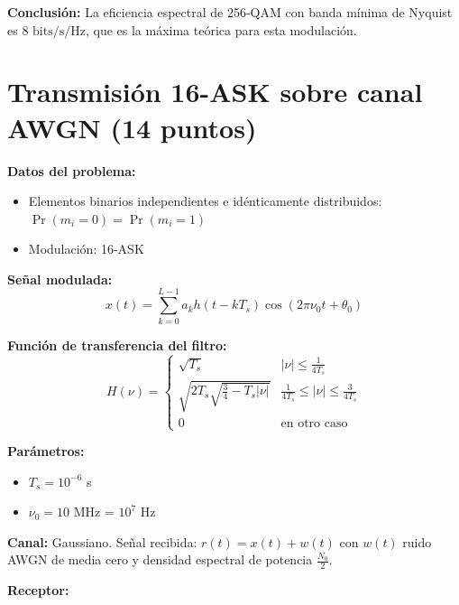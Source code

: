\documentclass[11pt,a4paper]{article}
\begin{document}
\textbf{Conclusi\'on:} La eficiencia espectral de 256-QAM con banda m\'inima de Nyquist es $\boxed{8 \text{ bits/s/Hz}}$, que es la m\'axima te\'orica para esta modulaci\'on.



\newpage
\section*{Transmisi\'on 16-ASK sobre canal AWGN (14 puntos)}

\textbf{Datos del problema:}
\begin{itemize}
    \item Elementos binarios independientes e id\'enticamente distribuidos: $\Pr(m_i = 0) = \Pr(m_i = 1)$
    \item Modulaci\'on: 16-ASK
\end{itemize}

\textbf{Se\~nal modulada:}
\[
x(t) = \sum_{k=0}^{L-1} a_k h(t-kT_s)\cos(2\pi\nu_0 t + \theta_0)
\]

\textbf{Funci\'on de transferencia del filtro:}
\[
H(\nu) = \begin{cases}
\sqrt{T_s} & |\nu| \leq \frac{1}{4T_s} \\
\sqrt{2T_s\sqrt{\frac{3}{4} - T_s|\nu|}} & \frac{1}{4T_s} \leq |\nu| \leq \frac{3}{4T_s} \\
0 & \text{en otro caso}
\end{cases}
\]

\textbf{Par\'ametros:}
\begin{itemize}
    \item $T_s = 10^{-6}$ s
    \item $\nu_0 = 10$ MHz = $10^7$ Hz
\end{itemize}

\textbf{Canal:} Gaussiano. Se\~nal recibida: $r(t) = x(t) + w(t)$ con $w(t)$ ruido AWGN de media cero y densidad espectral de potencia $\frac{N_0}{2}$.

\textbf{Receptor:}

\begin{center}
\end{center}
\end{document}
